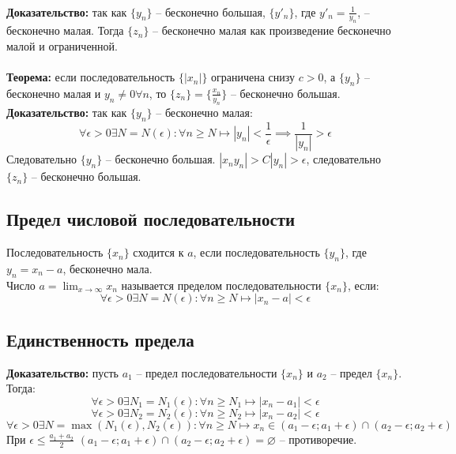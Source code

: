 \documentclass{article}
\begin{document}
        \\
        \textbf{Доказательство:}
        так как $\{y_n\}$ -- бесконечно большая, $\{y'_n\}$, где $y'_n = \frac{1}{y_n}$, -- бесконечно малая. Тогда $\{z_n\}$ -- бесконечно малая как
        произведение бесконечно малой и ограниченной.
        \\
        \\
        \textbf{Теорема:} если последовательность $\{|x_n|\}$ ограничена снизу $c > 0$, а $\{y_n\}$ -- бесконечно малая и $y_n \neq 0 \forall n$,
        то $\{z_n\} = \{\frac{x_n}{y_n}\}$ -- бесконечно большая.
        \\
        \textbf{Доказательство:}
        так как $\{y_n\}$ -- бесконечно малая:
        \[ \forall \epsilon > 0 \exists N = N(\epsilon): \forall n \ge N \longmapsto |y_n| < \frac{1}{\epsilon} \implies \frac{1}{|y_n|} > {\epsilon}\]
        Следовательно $\{y_n\}$ -- бесконечно большая. $ |x_ny_n| > C|y_n| > \epsilon $, следовательно $\{z_n\}$ -- бесконечно большая.
    
    
    \subsection*{Предел числовой последовательности}
        Последовательность $\{x_n\}$ сходится к $a$, если последовательность $\{y_n\}$, где $y_n = x_n - a$, бесконечно мала.
        \\
        Число $a = \lim_{x\to\infty} x_n$ называется пределом последовательности $\{x_n\}$, если:
        \\
        \[ \forall \epsilon > 0 \exists N = N(\epsilon): \forall n \ge N \longmapsto |x_n - a| < \epsilon \]
    
    
    \subsection*{Единственность предела}
        \textbf{Доказательство:}
        пусть $a_1$ -- предел последовательности $\{x_n\}$ и $a_2$ -- предел $\{x_n\}$. Тогда:
        \[ \forall \epsilon > 0 \exists N_1 = N_1(\epsilon): \forall n \ge N_1 \longmapsto |x_n - a_1| < \epsilon \]
        \[ \forall \epsilon > 0 \exists N_2 = N_2(\epsilon): \forall n \ge N_2 \longmapsto |x_n - a_2| < \epsilon \]
        \[ \forall \epsilon > 0 \exists N = \max (N_1(\epsilon), N_2(\epsilon)): \forall n \ge N \longmapsto
        x_n \in (a_1 - \epsilon; a_1 + \epsilon) \cap (a_2 - \epsilon; a_2 + \epsilon) \]
        При $\epsilon \le \frac{a_1 + a_2}{2}$ $(a_1 - \epsilon; a_1 + \epsilon) \cap (a_2 - \epsilon; a_2 + \epsilon) = \varnothing$ -- противоречие.
    
\end{document}
